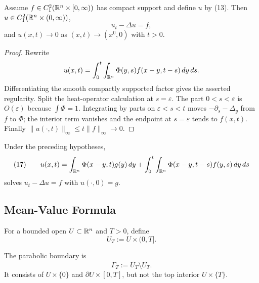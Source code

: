 \begin{theorem}
\label{thm:heat-equation-nonhomogeneous-solution}

Assume $f\in C_1^2(\mathbb{R}^n\times[0,\infty))$ has compact support and define
$u$ by (13). Then $u\in C_1^2(\mathbb{R}^n\times(0,\infty))$,
$$u_t-\Delta u=f,$$
and $u(x,t)\to0$ as $(x,t)\to(x^0,0)$ with $t>0$.
\end{theorem}
\begin{proof}
\sketch Rewrite
$$u(x,t)=\int_0^t\int_{\mathbb{R}^n}\Phi(y,s)f(x-y,t-s)\,dy\,ds.$$
Differentiating the smooth compactly supported factor gives the asserted
regularity. Split the heat-operator calculation at $s=\varepsilon$. The part
$0<s<\varepsilon$ is $O(\varepsilon)$ because $\int\Phi=1$. Integrating by
parts on $\varepsilon<s<t$ moves $-\partial_s-\Delta_y$ from $f$ to $\Phi$;
the interior term vanishes and the endpoint at $s=\varepsilon$ tends to
$f(x,t)$. Finally
$\|u(\cdot,t)\|_\infty\le t\|f\|_\infty\to0$.
\end{proof}

\begin{remark}
\label{rem:heat-equation-duhamel-combined}

Under the preceding hypotheses,
$$(17)\qquad
u(x,t)=\int_{\mathbb{R}^n}\Phi(x-y,t)g(y)\,dy
+\int_0^t\int_{\mathbb{R}^n}\Phi(x-y,t-s)f(y,s)\,dy\,ds$$
solves $u_t-\Delta u=f$ with $u(\cdot,0)=g$.
\end{remark}

\subsection{Mean-Value Formula}
\label{sec:heat-mean-value-formula}

\begin{definition}
\label{def:parabolic-cylinder-heat-ball}




For a bounded open $U\subset\mathbb{R}^n$ and $T>0$, define
$$U_T:=U\times(0,T].$$
\end{definition}

\begin{definition}
\label{def:parabolic-boundary-heat-ball}





The parabolic boundary is
$$\Gamma_T:=\overline U_T\setminus U_T.$$
It consists of $U\times\{0\}$ and $\partial U\times[0,T]$, but not the top
interior $U\times\{T\}$.
\end{definition}

